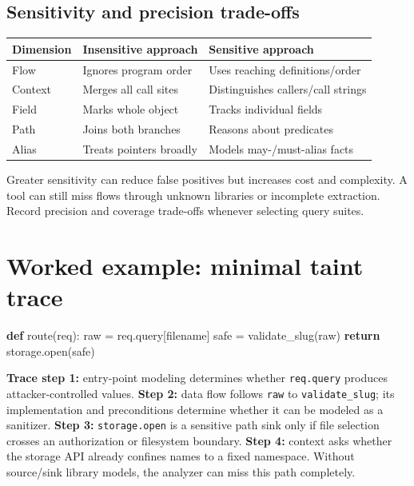 \documentclass[
  letterpaper,
]{article}
\newenvironment{Shaded}{}{}
\newcommand{\BuiltInTok}[1]{\textcolor[rgb]{0.00,0.50,0.00}{#1}}
\newcommand{\ControlFlowTok}[1]{\textcolor[rgb]{0.00,0.44,0.13}{\textbf{#1}}}
\newcommand{\KeywordTok}[1]{\textcolor[rgb]{0.00,0.44,0.13}{\textbf{#1}}}
\newcommand{\NormalTok}[1]{#1}
\newcommand{\OperatorTok}[1]{\textcolor[rgb]{0.40,0.40,0.40}{#1}}
\newcommand{\StringTok}[1]{\textcolor[rgb]{0.25,0.44,0.63}{#1}}
\begin{document}
\subsection{Sensitivity and precision
trade-offs}\label{sensitivity-and-precision-trade-offs}

\begin{longtable}[]{@{}lll@{}}
\toprule\noalign{}
Dimension & Insensitive approach & Sensitive approach \\
\midrule\noalign{}
\endhead
\bottomrule\noalign{}
\endlastfoot
Flow & Ignores program order & Uses reaching definitions/order \\
Context & Merges all call sites & Distinguishes callers/call strings \\
Field & Marks whole object & Tracks individual fields \\
Path & Joins both branches & Reasons about predicates \\
Alias & Treats pointers broadly & Models may-/must-alias facts \\
\end{longtable}

Greater sensitivity can reduce false positives but increases cost and
complexity. A tool can still miss flows through unknown libraries or
incomplete extraction. Record precision and coverage trade-offs whenever
selecting query suites.

\section{Worked example: minimal taint
trace}\label{worked-example-minimal-taint-trace}

\begin{Shaded}
\begin{Highlighting}[]
\KeywordTok{def}\NormalTok{ route(req):}
\NormalTok{    raw }\OperatorTok{=}\NormalTok{ req.query[}\StringTok{\textquotesingle{}filename\textquotesingle{}}\NormalTok{]}
\NormalTok{    safe }\OperatorTok{=}\NormalTok{ validate\_slug(raw)}
    \ControlFlowTok{return}\NormalTok{ storage.}\BuiltInTok{open}\NormalTok{(safe)}
\end{Highlighting}
\end{Shaded}

\textbf{Trace step 1:} entry-point modeling determines whether
\texttt{req.query} produces attacker-controlled values. \textbf{Step 2:}
data flow follows \texttt{raw} to \texttt{validate\_slug}; its
implementation and preconditions determine whether it can be modeled as
a sanitizer. \textbf{Step 3:} \texttt{storage.open} is a sensitive path
sink only if file selection crosses an authorization or filesystem
boundary. \textbf{Step 4:} context asks whether the storage API already
confines names to a fixed namespace. Without source/sink library models,
the analyzer can miss this path completely.
\end{document}
